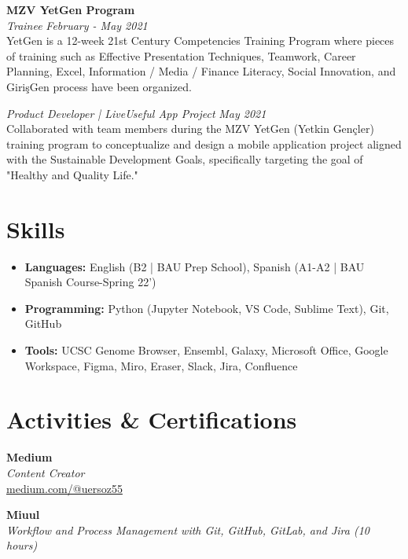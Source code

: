\documentclass[a4paper,10pt]{article}
\newcommand{\sepspace}{\noindent\makebox[\linewidth]{\rule{\textwidth}{0.4pt}}}
\begin{document}
\vspace{0.5cm}

\noindent\textbf{MZV YetGen Program} \\
\textit{Trainee} \hfill \textit{February - May 2021} \\
YetGen is a 12-week 21st Century Competencies Training Program where pieces of training such as Effective Presentation Techniques, Teamwork, Career Planning, Excel, Information / Media / Finance Literacy, Social Innovation, and GirişGen process have been organized.

\vspace{0.3cm}

\noindent\textit{Product Developer | LiveUseful App Project} \hfill \textit{May 2021} \\
Collaborated with team members during the MZV YetGen (Yetkin Gençler) training program to conceptualize and design a mobile application project aligned with the Sustainable Development Goals, specifically targeting the goal of "Healthy and Quality Life."

\sepspace

\section*{Skills}
\begin{itemize}[noitemsep]
    \item \textbf{Languages:} English (B2 | BAU Prep School), Spanish (A1-A2 | BAU Spanish Course-Spring 22')
    \item \textbf{Programming:} Python (Jupyter Notebook, VS Code, Sublime Text), Git, GitHub
    \item \textbf{Tools:} UCSC Genome Browser, Ensembl, Galaxy, Microsoft Office, Google Workspace, Figma, Miro, Eraser, Slack, Jira, Confluence
\end{itemize}

\sepspace

\section*{Activities \& Certifications}
\noindent\textbf{Medium} \\
\textit{Content Creator} \\
\href{https://medium.com/@uersoz55}{medium.com/@uersoz55}

\vspace{0.1cm}

\noindent\textbf{Miuul} \\
\textit{Workflow and Process Management with Git, GitHub, GitLab, and Jira (10 hours)}
\end{document}
